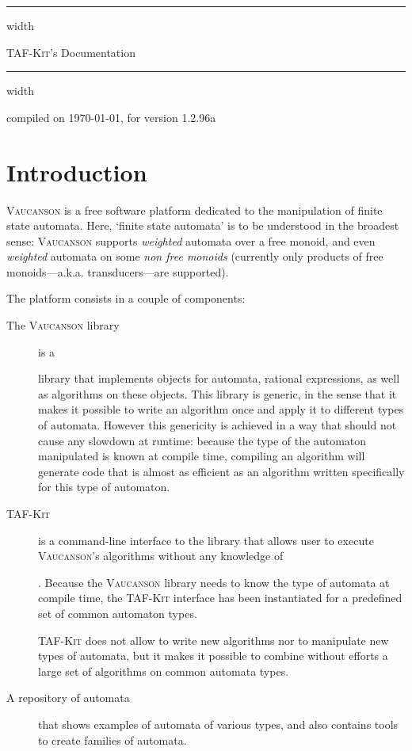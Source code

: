 \documentclass[a4paper]{report}
\makeatletter
\newcommand{\Cxx}{%
  \valign{\vfil\hbox{##}\vfil\cr
    {C\kern-.1em}\cr
    $\hbox{\fontsize\sf@size\z@\textbf{+\kern-0.05em+}}$\cr}%
    \xspace
}
\def\VcsnVersion{1.2.96a}
\newcommand{\tafkit}{\textsc{TAF-Kit}\xspace}
\newcommand{\Vauc}{\textsc{Vaucanson}\xspace}
\def\manualtitle{\tafkit's Documentation}
\makeatother
\begin{document}
\vspace*{50pt}
\vskip4pt \hrule height 4pt width \hsize \vskip4pt
\begin{center}
  \Huge \manualtitle
\end{center}
\vspace*{-1.5ex}
\vskip4pt \hrule height 4pt width \hsize \vskip4pt

\hfill compiled on \today, for version \VcsnVersion

\vfill

\setcounter{tocdepth}{2}
\makeatletter
{}
\makeatother

\vfill

\chapter*{Introduction}
\label{sec:intro}

\Vauc is a free software platform dedicated to the manipulation of
finite state automata.  Here, `finite state automata' is to be
understood in the broadest sense: \Vauc supports \emph{weighted}
automata over a free monoid, and even \emph{weighted} automata on some
\emph{non free monoids} (currently only products of free
monoids---a.k.a. transducers---are supported).

\bigskip

The platform consists in a couple of components:
\begin{description}
\item[The \Vauc library] is a \Cxx library that implements objects for
  automata, rational expressions, as well as algorithms on these
  objects.  This library is generic, in the sense that it makes it
  possible to write an algorithm once and apply it to different types
  of automata.  However this genericity is achieved in a way that
  should not cause any slowdown at runtime: because the type of the
  automaton manipulated is known at compile time, compiling an
  algorithm will generate code that is almost as efficient as an
  algorithm written specifically for this type of automaton.

\item[\tafkit] is a command-line interface to the library that allows
  user to execute \Vauc's algorithms without any knowledge of \Cxx.
  Because the \Vauc library needs to know the type of automata at
  compile time, the \tafkit interface has been instantiated for a
  predefined set of common automaton types.

  \tafkit does not allow to write new algorithms nor to manipulate new
  types of automata, but it makes it possible to combine without
  efforts a large set of algorithms on common automata types.

\item[A repository of automata] that shows examples of automata of
  various types, and also contains tools to create families of
  automata.
\end{description}
\end{document}
